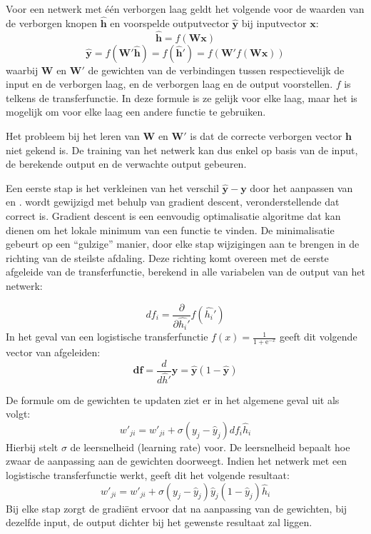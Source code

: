 Voor een netwerk met \'e\'en verborgen laag geldt het volgende voor de waarden van de verborgen knopen $\mathbf{\hat{h}}$ en voorspelde outputvector $\mathbf{\hat{y}}$ bij inputvector $\mathbf{x}$:
\begin{equation}
    \mathbf{\hat{h}} = f(\mathbf{Wx})
\end{equation}
\begin{equation}
    \boldsymbol{\hat{y}} = f(\boldsymbol{W'\hat{h}}) = f(\boldsymbol{\hat{h}'}) = f(\boldsymbol{W'}f(\boldsymbol{Wx}))
\end{equation}
waarbij $\mathbf{W}$ en $\mathbf{W'}$ de gewichten van de verbindingen tussen respectievelijk de input en de verborgen laag, en de verborgen laag en de output voorstellen. $f$ is telkens de transferfunctie. In deze formule is ze gelijk voor elke laag, maar het is mogelijk om voor elke laag een andere functie te gebruiken.

Het probleem bij het leren van $\mathbf{W}$ en $\mathbf{W'}$ is dat de correcte verborgen vector $\mathbf{h}$ niet gekend is. De training van het netwerk kan dus enkel op basis van de input, de  berekende output en de verwachte output gebeuren.

Een eerste stap is het verkleinen van het verschil $\mathbf{\hat{y}} - \mathbf{y}$ door het aanpassen van  en .  wordt gewijzigd met behulp van gradient descent, veronderstellende dat  correct is. Gradient descent is een eenvoudig optimalisatie algoritme dat kan dienen om het lokale minimum van een functie te vinden. De minimalisatie gebeurt op een ``gulzige'' manier, door elke stap wijzigingen aan te brengen in de richting van de steilste afdaling. Deze richting komt overeen met de eerste afgeleide van de transferfunctie, berekend in alle variabelen van de output van het netwerk:

\begin{equation}
df_i = \frac{\partial}{\partial\hat{h_i}'}f(\hat{h_i}')
\end{equation}
In het geval van een logistische transferfunctie $f(x) = \frac{1}{1 + \mathrm e^{-x}}$ geeft dit volgende vector van afgeleiden:
\begin{equation}
  \mathbf{df} = \frac{d}{d\hat{h}'}\mathbf{\hat{y}} = \mathbf{\hat{y}}(1-\mathbf{\hat{y}})
\end{equation}

De formule om de gewichten te updaten ziet er in het algemene geval uit als volgt:
\begin{equation}
  w'_{ji} = w'_{ji} + \sigma(y_j-\hat{y}_j)df_i\hat{h}_i
\end{equation}
Hierbij stelt $\sigma$ de leersnelheid (learning rate) voor. De leersnelheid bepaalt hoe zwaar de aanpassing aan de gewichten doorweegt.
Indien het netwerk met een logistische transferfunctie werkt, geeft dit het volgende resultaat:
\begin{equation}
    w'_{ji} = w'_{ji} + \sigma(y_j-\hat{y}_j)\hat{y}_j(1-\hat{y}_j)\hat{h}_i
\end{equation}
Bij elke stap zorgt de gradi\"ent ervoor dat na aanpassing van de gewichten, bij dezelfde input, de output dichter bij het gewenste resultaat zal liggen.

